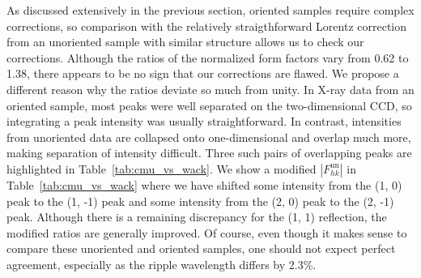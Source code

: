 As discussed extensively in the previous section, oriented samples require 
complex corrections, so 
comparison with the relatively straigthforward Lorentz correction from an 
unoriented sample with similar structure allows us to check our corrections.  
Although the ratios of the normalized form factors vary from 0.62 to 1.38, 
there appears to be no sign that our corrections are flawed.  We propose a 
different reason why the ratios deviate so much from unity. In X-ray data from 
an oriented sample, most peaks were
well separated on the two-dimensional CCD, so integrating a peak intensity was 
usually straightforward.
In contrast, intensities from unoriented data are collapsed onto 
one-dimensional and overlap much more, making separation of intensity 
difficult.  Three such pairs of overlapping peaks are highlighted in 
Table~\ref{tab:cmu_vs_wack}.  
We show a modified $\left|F_{hk}^\text{un}\right|$ in 
Table~\ref{tab:cmu_vs_wack} where we have shifted some intensity from 
the (1, 0) peak to the (1, -1) peak and some intensity from the (2, 0) peak 
to the (2, -1) peak.  
Although there is a remaining discrepancy for the (1, 1) reflection, 
the modified ratios are generally improved. Of course, even though it makes 
sense to compare these unoriented and oriented samples, one should not expect 
perfect agreement, especially as the ripple wavelength differs by 2.3\%.  


